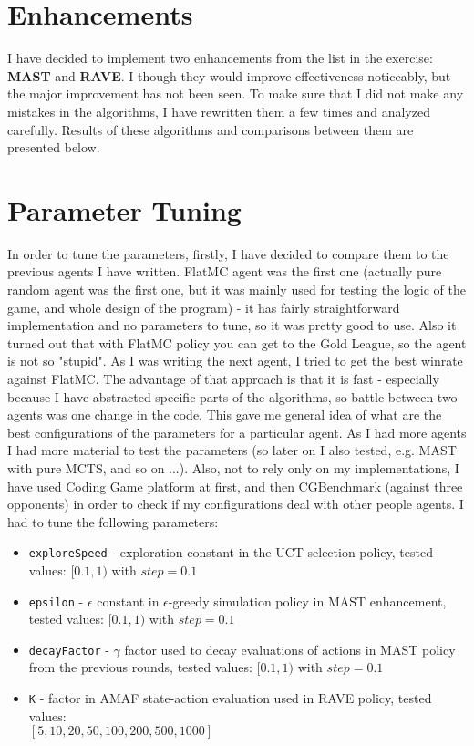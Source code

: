 \documentclass[11pt]{article}
\begin{document}
	\section{Enhancements}
	I have decided to implement two enhancements from the list in the exercise: \textbf{MAST} and \textbf{RAVE}. I though they would improve effectiveness noticeably, but the major improvement has not been seen. To make sure that I did not make any mistakes in the algorithms, I have rewritten them a few times and analyzed carefully. Results of these algorithms and comparisons between them are presented below.
	
	\section{Parameter Tuning}
	In order to tune the parameters, firstly, I have decided to compare them to the previous agents I have written. FlatMC agent was the first one (actually pure random agent was the first one, but it was mainly used for testing the logic of the game, and whole design of the program) - it has fairly straightforward implementation and no parameters to tune, so it was pretty good to use. Also it turned out that with FlatMC policy you can get to the Gold League, so the agent is not so "stupid". As I was writing the next agent, I tried to get the best winrate against FlatMC. The advantage of that approach is that it is fast - especially because I have abstracted specific parts of the algorithms, so battle between two agents was one change in the code. This gave me general idea of what are the best configurations of the parameters for a particular agent. As I had more agents I had more material to test the parameters (so later on I also tested, e.g. MAST with pure MCTS, and so on ...). Also, not to rely only on my implementations, I have used Coding Game platform at first, and then CGBenchmark (against three opponents) in order to check if my configurations deal with other people agents. I had to tune the following parameters:
	\begin{itemize}
		\item \texttt{exploreSpeed} - exploration constant in the UCT selection policy, tested values: $[0.1, 1)$ with $step=0.1$
		\item \texttt{epsilon} - $\epsilon$ constant in $\epsilon$-greedy simulation policy in MAST enhancement, tested values: $[0.1, 1)$ with $step=0.1$
		\item \texttt{decayFactor} - $\gamma$ factor used to decay evaluations of actions in MAST policy from the previous rounds, tested values: $[0.1, 1)$ with $step=0.1$
		\item \texttt{K} - factor in AMAF state-action evaluation used in RAVE policy, tested values: \\ $[5, 10, 20, 50, 100, 200, 500, 1000]$
	\end{itemize}
\end{document}
